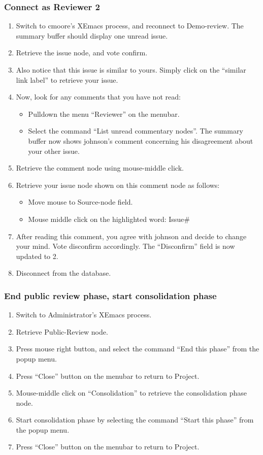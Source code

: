 \subsubsection {Connect as Reviewer 2}
\begin{enumerate}
\item Switch to cmoore's XEmacs process, and reconnect to
Demo-review. The summary buffer should display one unread issue.
\item Retrieve the issue node, and vote confirm.
\item Also notice that this issue is similar to yours.
Simply click on the ``similar link label'' to retrieve your issue.
\item Now, look for any comments that you have not read:
  \begin{itemize}
   \item Pulldown the menu ``Reviewer'' on the menubar.
   \item Select the command ``List unread commentary nodes''. 
      The summary buffer now shows johnson's comment concerning his
      disagreement about your other issue. 
  \end{itemize}
\item Retrieve the comment node using mouse-middle click.
\item Retrieve your issue node shown on this comment node as follows:
   \begin{itemize}
   \item Move mouse to Source-node field.
   \item Mouse middle click on the highlighted word: Issue\#
   \end{itemize}
\item After reading this comment, you agree with johnson and decide to
change your mind. Vote disconfirm accordingly. The ``Disconfirm''
field is now updated to 2.
\item Disconnect from the database.
\end{enumerate}


\subsubsection{End public review phase, start consolidation phase}

\begin{enumerate}
\item Switch to Administrator's XEmacs process.
\item Retrieve Public-Review node.
\item Press mouse right button, and select the command ``End this
phase'' from the popup menu. 
\item Press ``Close'' button on the menubar to return to Project.
\item Mouse-middle click on ``Consolidation'' to retrieve the
consolidation phase node.  
\item Start consolidation phase by selecting the command ``Start this
phase'' from the popup menu.
\item Press ``Close'' button on the menubar to return to Project.
\end{enumerate}



